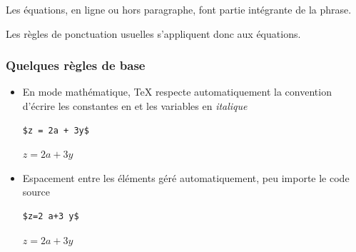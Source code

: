 \begin{frame}[plain]
  \begin{conseil}
    Les équations, en ligne ou hors paragraphe, font partie intégrante
    de la phrase.

    \bigskip %
    Les règles de ponctuation usuelles s'appliquent donc aux
    équations.
  \end{conseil}

  \vspace{18pt}
\end{frame}

\begin{frame}[fragile]
  \frametitle{Quelques règles de base}
  \begin{itemize}
  \item En mode mathématique, {\TeX} respecte automatiquement la
    convention d'écrire les constantes en  et les
    variables en \textit{italique}
    \begin{demo}
      \begin{texample}
\begin{lstlisting}
$z = 2a + 3y$
\end{lstlisting}
        \producing
        $z = 2a + 3y$
      \end{texample}
    \end{demo}
  \item Espacement entre les éléments géré automatiquement, peu importe
    le code source
    \begin{demo}
      \begin{texample}
\begin{lstlisting}
$z=2 a+3 y$
\end{lstlisting}
        \producing
        $z=2 a+3 y$
      \end{texample}
    \end{demo}
  \end{itemize}
\end{frame}

